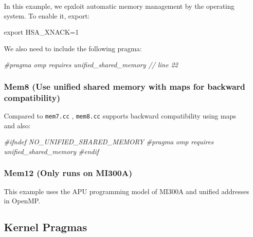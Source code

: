 \documentclass[
]{article}
\let\oldtexttt\texttt
\renewcommand{\texttt}[1]{
  \colorbox{Light}{\oldtexttt{#1}}
}
\newenvironment{Shaded}{}{}
\newcommand{\BuiltInTok}[1]{#1}
\newcommand{\CommentTok}[1]{\textcolor[rgb]{0.38,0.63,0.69}{\textit{#1}}}
\newcommand{\NormalTok}[1]{#1}
\newcommand{\VariableTok}[1]{\textcolor[rgb]{0.10,0.09,0.49}{#1}}
\begin{document}
In this example, we epxloit automatic memory management by the operating
system. To enable it, export:

\begin{Shaded}
\begin{Highlighting}[]
\BuiltInTok{export} \VariableTok{HSA\_XNACK=}\NormalTok{1}
\end{Highlighting}
\end{Shaded}

We also need to include the following pragma:

\begin{Shaded}
\begin{Highlighting}[]
\CommentTok{\#pragma omp requires unified\_shared\_memory // line 22}
\end{Highlighting}
\end{Shaded}

\hypertarget{mem8-use-unified-shared-memory-with-maps-for-backward-compatibility}{%
\subsubsection{Mem8 (Use unified shared memory with maps for backward
compatibility)}\label{mem8-use-unified-shared-memory-with-maps-for-backward-compatibility}}

Compared to \texttt{mem7.cc}, \texttt{mem8.cc} supports backward
compatibility using maps and also:

\begin{Shaded}
\begin{Highlighting}[]
\CommentTok{\#ifndef NO\_UNIFIED\_SHARED\_MEMORY}
\CommentTok{\#pragma omp requires unified\_shared\_memory}
\CommentTok{\#endif}
\end{Highlighting}
\end{Shaded}

\hypertarget{mem12-only-runs-on-mi300a}{%
\subsubsection{Mem12 (Only runs on
MI300A)}\label{mem12-only-runs-on-mi300a}}

This example uses the APU programming model of MI300A and unified
addresses in OpenMP.

\hypertarget{kernel-pragmas}{%
\subsection{Kernel Pragmas}\label{kernel-pragmas}}
\end{document}
